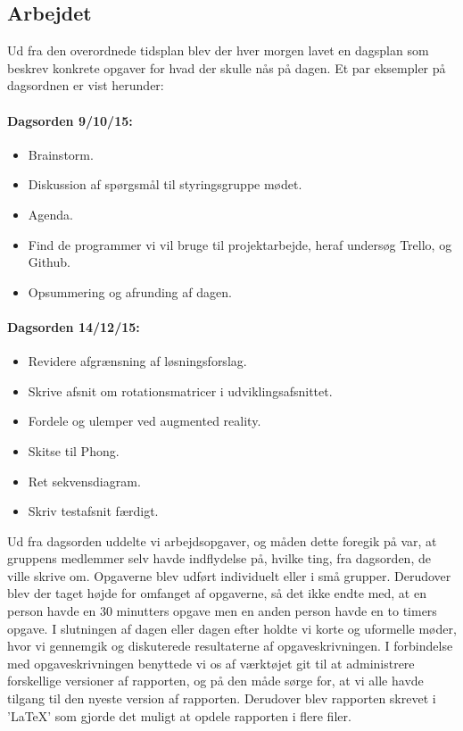 \subsection{Arbejdet}
Ud fra den overordnede tidsplan blev der hver morgen lavet en dagsplan som beskrev konkrete opgaver for hvad der skulle nås på dagen. Et par eksempler på dagsordnen er vist herunder:

\paragraph{Dagsorden 9/10/15:}
\begin{itemize}
  \item Brainstorm.
  \item Diskussion af spørgsmål til styringsgruppe mødet.
  \item Agenda.
  \item Find de programmer vi vil bruge til projektarbejde, heraf undersøg Trello, og Github.
  \item Opsummering og afrunding  af dagen.
\end{itemize}

\paragraph{Dagsorden 14/12/15:}
\begin{itemize}
  \item Revidere afgrænsning af løsningsforslag.
  \item Skrive afsnit om rotationsmatricer i udviklingsafsnittet.
  \item Fordele og ulemper ved augmented reality.
  \item Skitse til Phong.
  \item Ret sekvensdiagram.
  \item Skriv testafsnit færdigt.
\end{itemize}

Ud fra dagsorden uddelte vi arbejdsopgaver, og måden dette foregik på var, at gruppens medlemmer selv havde indflydelse på, hvilke ting, fra dagsorden, de ville skrive om. Opgaverne blev udført individuelt eller i små grupper. Derudover blev der taget højde for omfanget af opgaverne, så det ikke endte med, at en person havde en 30 minutters opgave men en anden person havde en to timers opgave. I slutningen af dagen eller dagen efter holdte vi korte og uformelle møder, hvor vi gennemgik og diskuterede resultaterne af opgaveskrivningen. I forbindelse med opgaveskrivningen benyttede vi os af værktøjet git til at administrere forskellige versioner af rapporten, og på den måde sørge for, at vi alle havde tilgang til den nyeste version af rapporten. Derudover blev rapporten skrevet i 'LaTeX' som gjorde det muligt at opdele rapporten i flere filer.  

